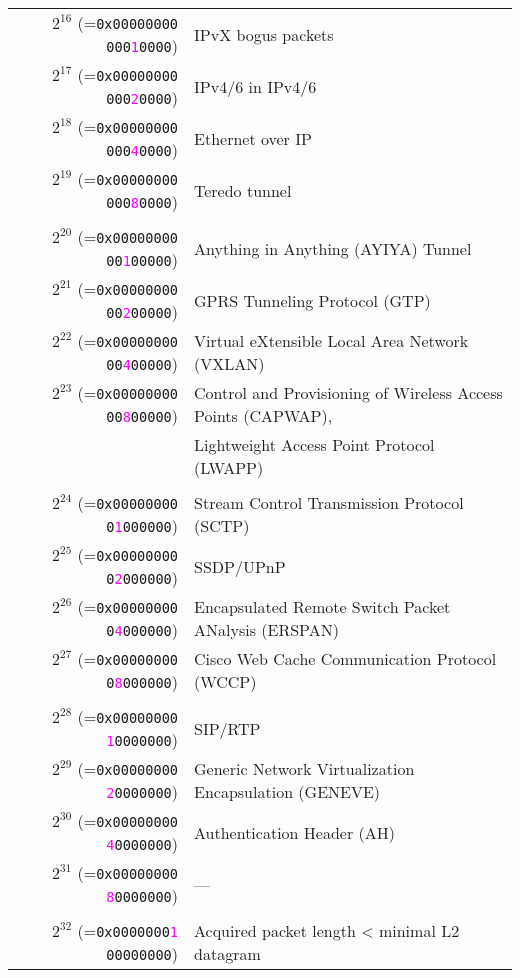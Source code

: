 \documentclass[documentation]{subfiles}
\begin{document}
\begin{longtable}{rl}
    \\
    $2^{16}$ (={\tt 0x00000000 000\textcolor{magenta}{1}0000}) & IPvX bogus packets\\
    $2^{17}$ (={\tt 0x00000000 000\textcolor{magenta}{2}0000}) & IPv4/6 in IPv4/6\\
    $2^{18}$ (={\tt 0x00000000 000\textcolor{magenta}{4}0000}) & Ethernet over IP\\
    $2^{19}$ (={\tt 0x00000000 000\textcolor{magenta}{8}0000}) & Teredo tunnel\\
    \\
    $2^{20}$ (={\tt 0x00000000 00\textcolor{magenta}{1}00000}) & Anything in Anything (AYIYA) Tunnel\\
    $2^{21}$ (={\tt 0x00000000 00\textcolor{magenta}{2}00000}) & GPRS Tunneling Protocol (GTP)\\
    $2^{22}$ (={\tt 0x00000000 00\textcolor{magenta}{4}00000}) & Virtual eXtensible Local Area Network (VXLAN)\\
    $2^{23}$ (={\tt 0x00000000 00\textcolor{magenta}{8}00000}) & Control and Provisioning of Wireless Access Points (CAPWAP),\\
                                                               & Lightweight Access Point Protocol (LWAPP)\\
    \\
    $2^{24}$ (={\tt 0x00000000 0\textcolor{magenta}{1}000000}) & Stream Control Transmission Protocol (SCTP)\\
    $2^{25}$ (={\tt 0x00000000 0\textcolor{magenta}{2}000000}) & SSDP/UPnP\\
    $2^{26}$ (={\tt 0x00000000 0\textcolor{magenta}{4}000000}) & Encapsulated Remote Switch Packet ANalysis (ERSPAN)\\
    $2^{27}$ (={\tt 0x00000000 0\textcolor{magenta}{8}000000}) & Cisco Web Cache Communication Protocol (WCCP)\\
    \\
    $2^{28}$ (={\tt 0x00000000 \textcolor{magenta}{1}0000000}) & SIP/RTP\\
    $2^{29}$ (={\tt 0x00000000 \textcolor{magenta}{2}0000000}) & Generic Network Virtualization Encapsulation (GENEVE)\\
    $2^{30}$ (={\tt 0x00000000 \textcolor{magenta}{4}0000000}) & Authentication Header (AH)\\
    $2^{31}$ (={\tt 0x00000000 \textcolor{magenta}{8}0000000}) & ---\\
    \\
    $2^{32}$ (={\tt 0x0000000\textcolor{magenta}{1} 00000000}) & Acquired packet length < minimal L2 datagram\\

\end{longtable}
\end{document}
